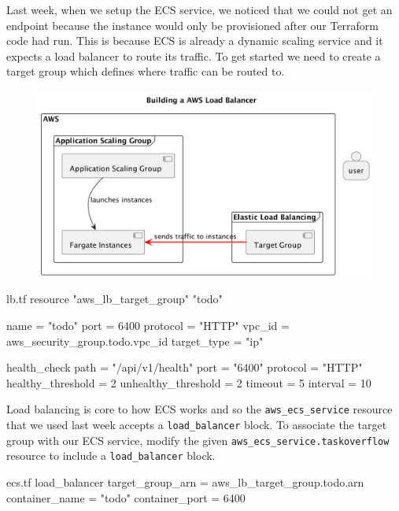 \documentclass{csse4400}
\begin{document}
Last week, when we setup the ECS service, we noticed that we could not get an endpoint because the instance would only be provisioned after our Terraform code had run.
This is because ECS is already a dynamic scaling service and it expects a load balancer to route its traffic.
To get started we need to create a target group which defines where traffic can be routed to.

\begin{figure}[H]
  \begin{center}
    \includegraphics[scale=0.2]{diagrams/lb2fargate}
  \end{center}
\end{figure}

\begin{code}[language=terraform,numbers=none,keepspaces=true]{lb.tf}
resource "aws_lb_target_group" "todo" {
  name          = "todo"
  port          = 6400
  protocol      = "HTTP"
  vpc_id        = aws_security_group.todo.vpc_id
  target_type   = "ip"

  health_check {
    path                = "/api/v1/health"
    port                = "6400"
    protocol            = "HTTP"
    healthy_threshold   = 2
    unhealthy_threshold = 2
    timeout             = 5
    interval            = 10
  }
}
\end{code}

Load balancing is core to how ECS works and so the \texttt{aws\_ecs\_service} resource that we used last week accepts a \texttt{load\_balancer} block.
To associate the target group with our ECS service,
modify the given \texttt{aws\_ecs\_service.taskoverflow} resource to include a \texttt{load\_balancer} block.

\begin{code}[language=terraform,numbers=none,keepspaces=true]{ecs.tf}
  load_balancer {
    target_group_arn = aws_lb_target_group.todo.arn
    container_name   = "todo"
    container_port   = 6400
  }
\end{code}
\end{document}
